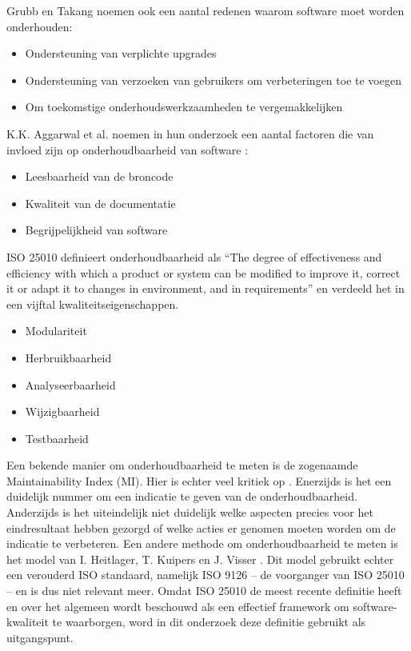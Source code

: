 Grubb en Takang noemen ook een aantal redenen waarom software moet worden onderhouden:
\begin{itemize}
	\item Ondersteuning van verplichte upgrades
	\item Ondersteuning van verzoeken van gebruikers om verbeteringen toe te voegen
	\item Om toekomstige onderhoudswerkzaamheden te vergemakkelijken
\end{itemize}

K.K. Aggarwal et al. noemen in hun onderzoek een aantal factoren die van invloed zijn op onderhoudbaarheid van software \parencite{MaintainabilityMeasure}:
\begin{itemize}
	\item Leesbaarheid van de broncode
	\item Kwaliteit van de documentatie
	\item Begrijpelijkheid van software
\end{itemize}

ISO 25010 \parencite{ISO25010} definieert onderhoudbaarheid als \enquote{The degree of effectiveness and efficiency with which a product or system can be modified to improve it, correct it or adapt it to changes in environment, and in requirements} en verdeeld het in een vijftal kwaliteitseigenschappen.
\begin{itemize}
	\item Modulariteit
	\item Herbruikbaarheid
	\item Analyseerbaarheid
	\item Wijzigbaarheid
	\item Testbaarheid
\end{itemize}

Een bekende manier om onderhoudbaarheid te meten is de zogenaamde Maintainability Index (MI). Hier is echter veel kritiek op \parencite{MaintainabilityLiteratureReview, WhyNoMI, WhyNoMI2, MeasuringMaintainability}. Enerzijds is het een duidelijk nummer om een indicatie te geven van de onderhoudbaarheid. Anderzijds is het uiteindelijk niet duidelijk welke aspecten precies voor het eindresultaat hebben gezorgd of welke acties er genomen moeten worden om de indicatie te verbeteren. Een andere methode om onderhoudbaarheid te meten is het model van I. Heitlager, T. Kuipers en J. Visser \parencite{MeasuringMaintainability}. Dit model gebruikt echter een verouderd ISO standaard, namelijk ISO 9126 -- de voorganger van ISO 25010 -- en is dus niet relevant meer. Omdat ISO 25010 \parencite{ISO25010} de meest recente definitie heeft en over het algemeen wordt beschouwd als een effectief framework om software-kwaliteit te waarborgen, word in dit onderzoek deze definitie gebruikt als uitgangspunt.

